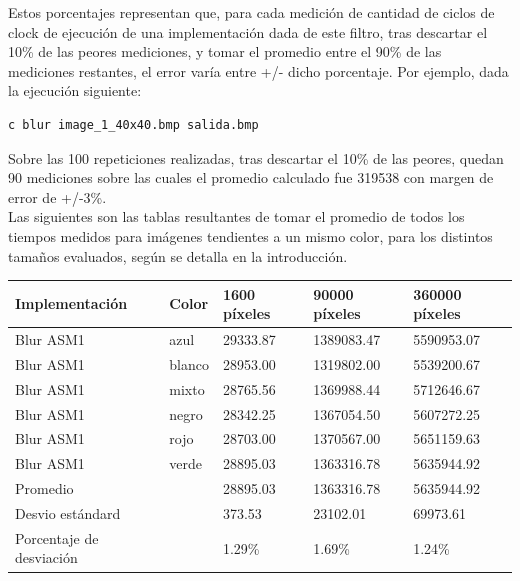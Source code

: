 Estos porcentajes representan que, para cada medición de cantidad de ciclos de clock de ejecución de una implementación dada de este filtro, tras descartar el 10\% de las peores mediciones, y tomar el promedio entre el 90\% de las mediciones restantes, el error varía entre +/- dicho porcentaje. Por ejemplo, dada la ejecución siguiente:\\

\begin{verbatim}
c blur image_1_40x40.bmp salida.bmp
\end{verbatim}
Sobre las 100 repeticiones realizadas, tras descartar el 10\% de las peores, quedan 90 mediciones sobre las cuales el promedio calculado fue 319538 con margen de error de +/-3\%.\\
Las siguientes son las tablas resultantes de tomar el promedio de todos los tiempos medidos para imágenes tendientes a un mismo color, para los distintos tamaños evaluados, según se detalla en la introducción.\\

\begin{tabular}{| l | l | l | l | l |}
\hline
Implementación & Color & 1600 píxeles & 90000 píxeles & 360000 píxeles\\
\hline
Blur ASM1 & azul & 29333.87 & 1389083.47&  5590953.07\\ 
\hline
Blur ASM1 & blanco & 28953.00&  1319802.00 & 5539200.67\\ 
\hline
Blur ASM1 & mixto & 28765.56  &1369988.44  & 5712646.67\\ 
\hline
Blur ASM1 & negro & 28342.25  &1367054.50  & 5607272.25\\
\hline
Blur ASM1 & rojo & 28703.00  &1370567.00  & 5651159.63\\
\hline
Blur ASM1 & verde & 28895.03  &1363316.78  & 5635944.92\\ 
\hline
Promedio & &  28895.03  &1363316.78 & 5635944.92\\
\hline
Desvio estándard  && 373.53  &23102.01 &  69973.61\\
\hline
Porcentaje de desviación  && 1.29\%& 1.69\%& 1.24\%\\
\hline
\end{tabular}

